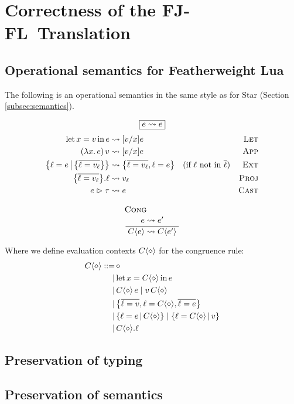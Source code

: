 \chapter{Correctness of the FJ-FL~Translation}
\label{extra:fj-fl-proofs}

\section{Operational semantics for Featherweight Lua}

The following is an operational semantics in the same style as for Star (Section \ref{subsec:semantics}).

$$ \boxed{e \leadsto e} $$
\begin{align*}
\fllet x v e &\step [v/x] e
&\textsc{Let} \\
(\fllam x e)\,v &\step [v/x]e
&\textsc{App} \\
\flext{\ell = e}{\flrec{\overline{\ell = v_\ell}}} &\step \flrec{\overline{\ell = v_\ell}, \ell = e} \quad \text{(if $\ell$ not in $\overline \ell$)}
&\textsc{Ext} \\
\flproj{\flrec{\overline{\ell = v_\ell}}}{\ell} &\step v_\ell
&\textsc{Proj} \\
\flcast{e}{\tau} &\step e 
&\textsc{Cast}
\end{align*}
$$ \irule{Cong}{e \leadsto e'}{\ctx{\evalct}{e} \leadsto \ctx{\evalct}{e'}} $$

Where we define evaluation contexts $\evalctx$ for the congruence rule:
\begin{align*}
\evalctx ::=&\, 
\ctxhole
\\ \mid&\, 
\fllet{x}{\evalctx}{e}
\\ \mid&\, 
\evalctx\,e \mid v\,\evalctx
\\ \mid&\, 
\flrec{\overline{\ell = v}, \ell = \evalctx, \overline{\ell = e}}
\\ \mid&\, 
\flext{\ell = e}{\evalctx} \mid \flext{\ell = \evalctx}{v}
\\ \mid&\, 
\evalctx{.}\ell
\end{align*}

\section{Preservation of typing}

\section{Preservation of semantics}

